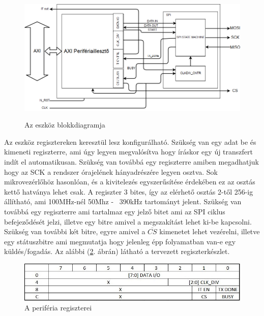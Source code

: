 \documentclass[a4paper,11pt]{article}
\begin{document}
\begin{figure}[H]
	\begin{center}
	\includegraphics[scale=0.5]{system_blockdesign.png}
	\label{fig:system_main}
	\end{center}
	\caption{Az eszköz blokkdiagramja}
\end{figure}

Az eszköz regisztereken keresztül lesz konfigurálható. Szükség van egy adat be és kimeneti regiszterre, ami úgy legyen megvalósítva hogy íráskor egy új transzfert indít el automatikusan. Szükség van továbbá egy regiszterre amiben megadhatjuk hogy az SCK a rendszer órajelének hányadrészére legyen osztva. Sok mikrovezérlőhöz hasonlóan, és a kivitelezés egyszerűsítése érdekében ez az osztás kettő hatványa lehet csak. A regiszter 3 bites, így az elérhető osztás 2-től 256-ig állítható, ami 100MHz-nél 50Mhz - ~390kHz tartományt jelent. Szükség van továbbá egy regiszterre ami tartalmaz egy jelző bitet ami az SPI ciklus befejeződését jelzi, illetve egy bitre amivel a megszakítást lehet ki-be kapcsolni. Szükség van további két bitre, egyre amivel a $\overline{CS}$ kimenetet lehet vezérelni, illetve egy státuszbitre ami megmutatja hogy jelenleg épp folyamatban van-e egy küldés/fogadás. Az alábbi (\ref{fig:registers}. ábrán) látható a tervezett regiszterkészlet.

\begin{figure}[H]
	\begin{center}
	\includegraphics[scale=1]{reg_set.JPG}	
	\end{center}
	\caption{A periféria regiszterei}
	\label{fig:registers}
\end{figure}
\end{document}
